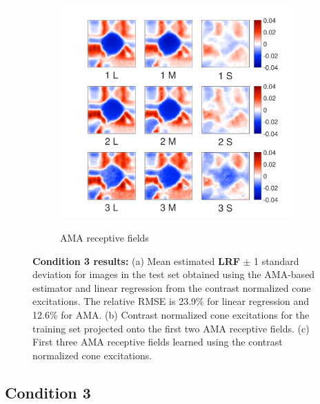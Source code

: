 \documentclass{jov}
\providecommand{\DIFaddtex}[1]{{\bf #1}} %
\providecommand{\DIFdeltex}[1]{} %
\providecommand{\DIFaddFL}[1]{\DIFadd{#1}} %
\providecommand{\DIFdelFL}[1]{\DIFdel{#1}} %
\providecommand{\DIFaddbeginFL}{} %
\providecommand{\DIFaddendFL}{} %
\providecommand{\DIFdelbeginFL}{} %
\providecommand{\DIFdelendFL}{} %
\providecommand{\DIFadd}[1]{\texorpdfstring{\DIFaddtex{#1}}{#1}} %
\providecommand{\DIFdel}[1]{\texorpdfstring{\DIFdeltex{#1}}{}} %
\newcommand{\DIFscaledelfig}{0.5}
\newlength{\DIFdelgraphicswidth} %
\newlength{\DIFdelgraphicsheight} %
\newcommand{\DIFaddincludegraphics}[2][]{{\color{blue}\fbox{\DIFOincludegraphics[#1]{#2}}}} %
\newcommand{\DIFdelincludegraphics}[2][]{%
\sbox{\DIFdelgraphicsbox}{\DIFOincludegraphics[#1]{#2}}%
\settoboxwidth{\DIFdelgraphicswidth}{\DIFdelgraphicsbox} %
\settoboxtotalheight{\DIFdelgraphicsheight}{\DIFdelgraphicsbox} %
\scalebox{\DIFscaledelfig}{%
\parbox[b]{\DIFdelgraphicswidth}{\usebox{\DIFdelgraphicsbox}\\[-\baselineskip] \rule{\DIFdelgraphicswidth}{0em}}\llap{\resizebox{\DIFdelgraphicswidth}{\DIFdelgraphicsheight}{%
\setlength{\unitlength}{\DIFdelgraphicswidth}%
\begin{picture}(1,1)%
\thicklines\linethickness{2pt} %
{\color[rgb]{1,0,0}\put(0,0){\framebox(1,1){}}}%
{\color[rgb]{1,0,0}\put(0,0){\line( 1,1){1}}}%
{\color[rgb]{1,0,0}\put(0,1){\line(1,-1){1}}}%
\end{picture}%
}\hspace*{3pt}}} %
} %
\DeclareRobustCommand{\DIFaddbeginFL}{\DIFOaddbeginFL \let\includegraphics\DIFaddincludegraphics} %
\DeclareRobustCommand{\DIFaddendFL}{\DIFOaddendFL \let\includegraphics\DIFOincludegraphics} %
\DeclareRobustCommand{\DIFdelbeginFL}{\DIFOdelbeginFL \let\includegraphics\DIFdelincludegraphics} %
\DeclareRobustCommand{\DIFdelendFL}{\DIFOaddendFL \let\includegraphics\DIFOincludegraphics} %
\begin{document}
\begin{figure}
\begin{subfigure}[b]{0.31\textwidth}
        \label{fig:case3RFResponse}
    \end{subfigure}
    \begin{subfigure}[b]{0.32 \textwidth}
	\caption{AMA receptive fields}
	\includegraphics[width=1.0\textwidth, trim={0.2cm -0.cm 0 0.3cm}]{../FiguresDraft5/Figure12/Figure12_c.pdf}
	\label{fig:case3RFs}
    \end{subfigure}
    \caption{{\bf Condition 3 results:} (a) Mean estimated \DIFdelbeginFL \DIFdelFL{LRV }\DIFdelendFL \DIFaddbeginFL \DIFaddFL{LRF }\DIFaddendFL $\pm$ 1 standard deviation for images in the test set obtained using the AMA-based estimator and linear regression from the contrast normalized cone excitations. The relative RMSE is 23.9\%  for linear regression and 12.6\% for AMA. (b) Contrast normalized cone excitations for the training set projected onto the first two AMA receptive fields. (c) First three AMA receptive fields learned using the contrast normalized cone excitations.}
\label{fig:Condition3}
\end{figure}

\subsection{Condition 3}
\end{document}
